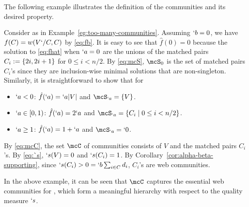 The following example illustrates the definition of the communities and its desired property.
\begin{example}
  \label{eg:mcC}
  Consider  as in Example~\ref{eg:too-many-communities}. Assuming $`b=0$, we have $f(C)=w(V`/C,C)$ by \eqref{eq:fb}. It is easy to see that $\hat{f}(0)=0$ because the solution to \eqref{eq:fhat} when $`a=0$ are the unions of the matched pairs $C_i:=\{2i,2i+1\}$ for $0\leq i<n/2$. By \eqref{eq:mcS}, $\mcS_0$ is the set of matched pairs $C_i$'s since they are inclusion-wise minimal solutions that are non-singleton. Similarly, it is straightforward to show that for
  \begin{itemize}
	  \setlength\itemsep{-.8em}
	  \item $`a<0$: $\hat{f}(`a) = `a\lvert V\rvert$ and $\mcS_{`a}=\Set{V}$.\\
	  \item $`a\in [0,1)$: $\hat{f}(`a) = 2`a$ and $\mcS_{`a}=\Set{C_i\mid 0\leq i< n/2}$.\\
	  \item $`a\geq 1$: $\hat{f}(`a) = 1+`a$ and $\mcS_{`a}=`0$.
  \end{itemize}
  By \eqref{eq:mcC}, the set $\mcC$ of communities consists of $V$ and the matched pairs $C_i$'s. By \eqref{eq:`s}, $`s(V)=0$ and $`s(C_i)=1$. By Corollary~\ref{cor:alpha-beta-supporting}, since $`s(C_i)>0=`b\sum_{i\in C}d_i$, $C_i$'s are web communities. 
\end{example}

In the above example, it can be seen that $\mcC$ captures the essential web communities for , which form a meaningful hierarchy with respect to the quality measure $`s$. 

